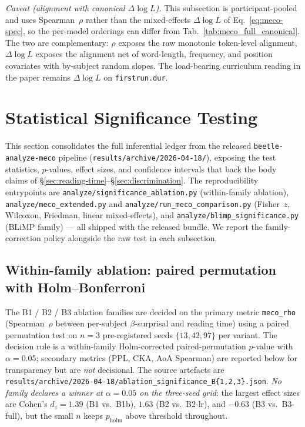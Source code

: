 \emph{Caveat (alignment with canonical $\Delta\log L$).} This subsection is participant-pooled and uses Spearman~$\rho$ rather than the mixed-effects $\Delta\log L$ of Eq.~\ref{eq:meco-spec}, so the per-model orderings can differ from Tab.~\ref{tab:meco_full_canonical}. The two are complementary: $\rho$ exposes the raw monotonic token-level alignment, $\Delta\log L$ exposes the alignment net of word-length, frequency, and position covariates with by-subject random slopes. The load-bearing curriculum reading in the paper remains $\Delta\log L$ on \texttt{firstrun.dur}.

\section{Statistical Significance Testing}\label{sec:significance-comprehensive}

This section consolidates the full inferential ledger from the released \texttt{beetle-analyze-meco} pipeline (\texttt{results/archive/2026-04-18/}), exposing the test statistics, $p$-values, effect sizes, and confidence intervals that back the body claims of \S\ref{sec:reading-time}--\S\ref{sec:discrimination}. The reproducibility entrypoints are \texttt{analyze/significance\_ablation.py} (within-family ablation), \texttt{analyze/meco\_extended.py} and \texttt{analyze/run\_meco\_comparison.py} (Fisher~$z$, Wilcoxon, Friedman, linear mixed-effects), and \texttt{analyze/blimp\_significance.py} (BLiMP family) --- all shipped with the released bundle. We report the family-correction policy alongside the raw test in each subsection.

\subsection{Within-family ablation: paired permutation with Holm--Bonferroni}\label{sec:sig-ablation}

The B1 / B2 / B3 ablation families are decided on the primary metric \texttt{meco\_rho} (Spearman~$\rho$ between per-subject $\beta$-surprisal and reading time) using a paired permutation test on $n=3$ pre-registered seeds $\{13, 42, 97\}$ per variant. The decision rule is a within-family Holm-corrected paired-permutation $p$-value with $\alpha = 0.05$; secondary metrics (PPL, CKA, AoA Spearman) are reported below for transparency but are \emph{not} decisional. The source artefacts are \texttt{results/archive/2026-04-18/ablation\_significance\_B\{1,2,3\}.json}. \emph{No family declares a winner at $\alpha=0.05$ on the three-seed grid}: the largest effect sizes are Cohen's $d_z = 1.39$ (B1 vs.\ B1b), $1.63$ (B2 vs.\ B2-lr), and $-0.63$ (B3 vs.\ B3-full), but the small $n$ keeps $p_{\mathrm{holm}}$ above threshold throughout.

